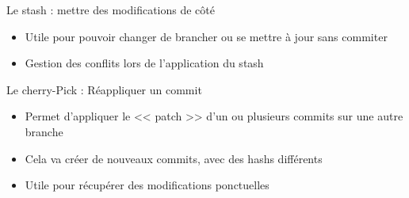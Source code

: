 \documentclass[xcolor=x11names,compress]{beamer}
\begin{document}
\begin{frame}{Le stash : mettre des modifications de côté}
	\begin{itemize}
		\item Utile pour pouvoir changer de brancher ou se mettre à jour sans commiter
		\item Gestion des conflits lors de l'application du stash 
	\end{itemize}
	\vfill
\end{frame}

\begin{frame}{Le cherry-Pick : Réappliquer un commit}
	\begin{itemize}
		\item Permet d'appliquer le << patch >> d'un ou plusieurs commits sur une autre branche 
		\item Cela va créer de nouveaux commits, avec des hashs différents
		\item Utile pour récupérer des modifications ponctuelles 
	\end{itemize}
	\vfill
\end{frame}
\end{document}

